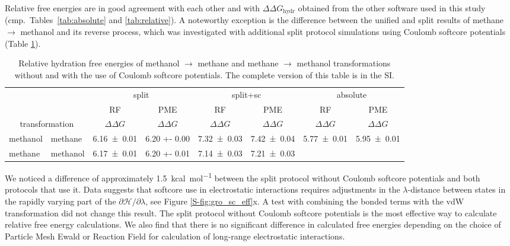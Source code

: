 \documentclass[journal=jctcce,manuscript=article]{achemso}
\begin{document}
Relative free energies are in good agreement with each other and with 
$\Delta \Delta G_{\mathrm{hydr}}$ obtained from the other software used in this 
study (cmp.\ Tables~\ref{tab:absolute} and \ref{tab:relative}).  A noteworthy 
exception is the difference between the unified and split results of methane 
$\rightarrow$ methanol and its reverse process, which was investigated with 
additional split protocol simulations using Coulomb softcore potentials (Table 
\ref{tab:eff-sc}).

\begin{table}[]
\centering
\caption{Relative hydration free energies of methanol $\rightarrow$ methane and 
methane $\rightarrow$
methanol transformations without and with the use of Coulomb softcore 
potentials. The complete version 
of this table is in the SI.}
\label{tab:eff-sc}
\begin{tabular}{@{}llclclcl@{}}
\toprule
 &  & \multicolumn{2}{c}{split} & \multicolumn{2}{c}{split+sc} & 
 \multicolumn{2}{c}{absolute} \\
 &  & RF & \multicolumn{1}{c}{PME} & RF & \multicolumn{1}{c}{PME} & RF & 
 \multicolumn{1}{c}{PME} \\
\multicolumn{2}{c}{transformation} & $\Delta \Delta G$ & 
\multicolumn{1}{c}{$\Delta \Delta G$} & $\Delta \Delta G$ & 
\multicolumn{1}{c}{$\Delta \Delta G$} & $\Delta \Delta G$ & 
\multicolumn{1}{c}{$\Delta \Delta G$} \\ \midrule
methanol & methane & \multicolumn{1}{l}{\num{6.16 +- 0.01}} & \num{6.20 +- 
0.00} & \multicolumn{1}{l}{\num{7.32+-0.03}} & \num{7.42+-0.04} & 
\multicolumn{1}{l}{\num{5.77 +- 0.01}} & \num{5.95 +- 0.01} \\
methane & methanol & \multicolumn{1}{l}{\num{6.17 +- 0.01}} & \num{6.20 +- 
0.01} & \multicolumn{1}{l}{\num{7.14+-0.03}} & \num{7.21+-0.03} & 
\multicolumn{1}{l}{} &  \\ \bottomrule
\end{tabular}
\end{table}

We noticed a difference of approximately \SI{1.5}{kcal.mol^{-1}} between the 
split protocol without  Coulomb softcore potentials and both protocols that 
use it. Data suggests that softcore use in electrostatic interactions requires 
adjustments in the $\lambda$-distance between states in the
rapidly varying part of the $\partial \mathcal{H}/\partial\lambda$, see Figure
\ref{S-fig:gro_sc_eff}x. A test with combining the bonded terms with the vdW 
transformation did not change this result.  The split protocol without Coulomb softcore potentials is the most effective way to calculate relative free energy calculations.  We also find that there is no significant difference in calculated free energies depending on the choice of Particle Mesh Ewald or Reaction Field for calculation of long-range electrostatic interactions.
\end{document}
